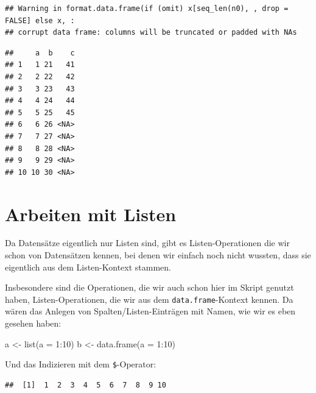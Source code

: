 \documentclass[
]{book}
\newenvironment{Shaded}{\begin{snugshade}}{\end{snugshade}}
\newcommand{\AttributeTok}[1]{\textcolor[rgb]{0.77,0.63,0.00}{#1}}
\newcommand{\DecValTok}[1]{\textcolor[rgb]{0.00,0.00,0.81}{#1}}
\newcommand{\FunctionTok}[1]{\textcolor[rgb]{0.00,0.00,0.00}{#1}}
\newcommand{\NormalTok}[1]{#1}
\newcommand{\OtherTok}[1]{\textcolor[rgb]{0.56,0.35,0.01}{#1}}
\newcommand{\SpecialCharTok}[1]{\textcolor[rgb]{0.00,0.00,0.00}{#1}}
\begin{document}
\begin{verbatim}
## Warning in format.data.frame(if (omit) x[seq_len(n0), , drop = FALSE] else x, :
## corrupt data frame: columns will be truncated or padded with NAs
\end{verbatim}

\begin{verbatim}
##     a  b    c
## 1   1 21   41
## 2   2 22   42
## 3   3 23   43
## 4   4 24   44
## 5   5 25   45
## 6   6 26 <NA>
## 7   7 27 <NA>
## 8   8 28 <NA>
## 9   9 29 <NA>
## 10 10 30 <NA>
\end{verbatim}

\hypertarget{arbeiten-mit-listen}{%
\section{Arbeiten mit Listen}\label{arbeiten-mit-listen}}

Da Datensätze eigentlich nur Listen sind, gibt es Listen-Operationen die wir schon von Datensätzen kennen, bei denen wir einfach noch nicht wussten, dass sie eigentlich aus dem Listen-Kontext stammen.

Insbesondere sind die Operationen, die wir auch schon hier im Skript genutzt haben, Listen-Operationen, die wir aus dem \texttt{data.frame}-Kontext kennen.
Da wären das Anlegen von Spalten/Listen-Einträgen mit Namen, wie wir es eben gesehen haben:

\begin{Shaded}
\begin{Highlighting}[]
\NormalTok{a }\OtherTok{\textless{}{-}} \FunctionTok{list}\NormalTok{(}\AttributeTok{a =} \DecValTok{1}\SpecialCharTok{:}\DecValTok{10}\NormalTok{)}
\NormalTok{b }\OtherTok{\textless{}{-}} \FunctionTok{data.frame}\NormalTok{(}\AttributeTok{a =} \DecValTok{1}\SpecialCharTok{:}\DecValTok{10}\NormalTok{)}
\end{Highlighting}
\end{Shaded}

Und das Indizieren mit dem \texttt{\$}-Operator:

\begin{Shaded}
\end{Shaded}

\begin{verbatim}
##  [1]  1  2  3  4  5  6  7  8  9 10
\end{verbatim}
\end{document}
